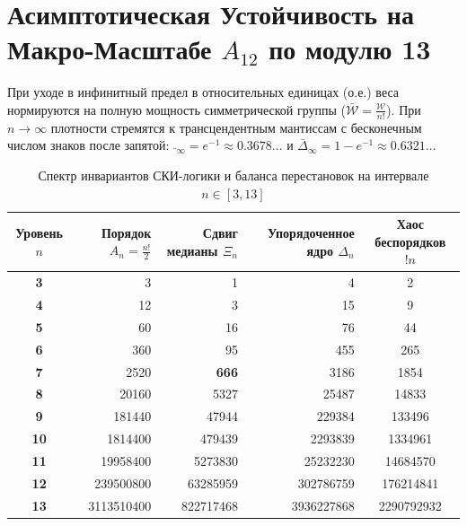 \documentclass[10pt,twocolumn]{article}
\begin{document}
\section{Асимптотическая Устойчивость на Макро-Масштабе $A_{12}$ по модулю 13}
При уходе в инфинитный предел в относительных единицах (о.е.) веса нормируются на полную мощность симметрической группы ($\bar{\mathcal{W}} = \frac{\mathcal{W}}{n!}$). При $n \to \infty$ плотности стремятся к трансцендентным мантиссам с бесконечным числом знаков после запятой: $\bar{\!~}_\infty = e^{-1} \approx 0.3678\dots$ и $\bar{\Delta}_\infty = 1 - e^{-1} \approx 0.6321\dots$

\begin{table}[ht]
\centering
\caption{Спектр инвариантов СКИ-логики и баланса перестановок на интервале $n \in [3, 13]$}
\label{tab:комбинаторика}
\begin{tabular}{crrrc}
\toprule
Уровень $n$ & Порядок $A_n = \frac{n!}{2}$ & Сдвиг медианы $\Xi_n$ & Упорядоченное ядро $\Delta_n$ & Хаос беспорядков $!n$ \\ \midrule
\textbf{3}  & 3                            & 1                     & 4                             & 2                     \\
\textbf{4}  & 12                           & 3                     & 15                            & 9                     \\
\textbf{5}  & 60                           & 16                    & 76                            & 44                    \\
\textbf{6}  & 360                          & 95                    & 455                           & 265                   \\
\textbf{7}  & 2520                         & \textbf{666}          & 3186                          & 1854                  \\
\textbf{8}  & 20160                        & 5327                  & 25487                         & 14833                 \\
\textbf{9}  & 181440                       & 47944                 & 229384                        & 133496                \\
\textbf{10} & 1814400                      & 479439                & 2293839                       & 1334961               \\
\textbf{11} & 19958400                     & 5273830               & 25232230                      & 14684570              \\
\textbf{12} & 239500800                    & 63285959              & 302786759                     & 176214841             \\
\textbf{13} & 3113510400                   & 822717468             & 3936227868                    & 2290792932            \\ \bottomrule
\end{tabular}
\end{table}
\end{document}
